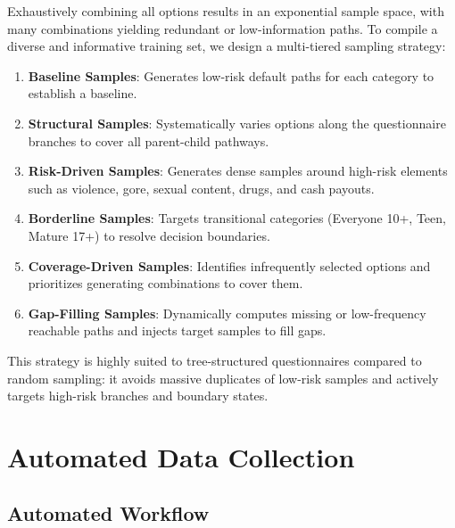 \documentclass[11pt,a4paper]{article}
\begin{document}
Exhaustively combining all options results in an exponential sample space, with many combinations yielding redundant or low-information paths. To compile a diverse and informative training set, we design a multi-tiered sampling strategy:
\begin{enumerate}[leftmargin=2em]
  \item \textbf{Baseline Samples}: Generates low-risk default paths for each category to establish a baseline.
  \item \textbf{Structural Samples}: Systematically varies options along the questionnaire branches to cover all parent-child pathways.
  \item \textbf{Risk-Driven Samples}: Generates dense samples around high-risk elements such as violence, gore, sexual content, drugs, and cash payouts.
  \item \textbf{Borderline Samples}: Targets transitional categories (Everyone 10+, Teen, Mature 17+) to resolve decision boundaries.
  \item \textbf{Coverage-Driven Samples}: Identifies infrequently selected options and prioritizes generating combinations to cover them.
  \item \textbf{Gap-Filling Samples}: Dynamically computes missing or low-frequency reachable paths and injects target samples to fill gaps.
\end{enumerate}

This strategy is highly suited to tree-structured questionnaires compared to random sampling: it avoids massive duplicates of low-risk samples and actively targets high-risk branches and boundary states.

\section{Automated Data Collection}

\subsection{Automated Workflow}
\end{document}
